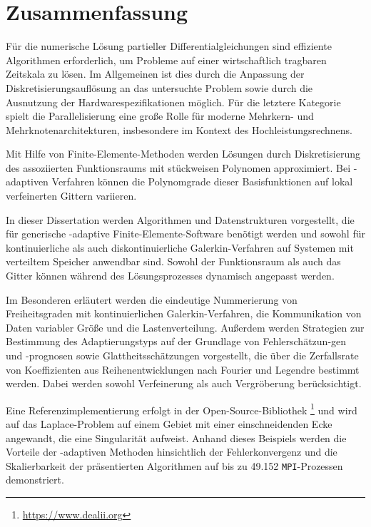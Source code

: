 \section*{\centering Zusammenfassung}

Für die numerische Lösung partieller Differentialgleichungen sind effiziente Algorithmen erforderlich, um Probleme auf einer wirtschaftlich tragbaren Zeitskala zu lösen.
Im Allgemeinen ist dies durch die Anpassung der Diskretisierungsauflösung an das untersuchte Problem sowie durch die Ausnutzung der Hardwarespezifikationen möglich.
Für die letztere Kategorie spielt die Parallelisierung eine große Rolle für moderne Mehrkern- und Mehrknotenarchitekturen, insbesondere im Kontext des Hochleistungsrechnens.

Mit Hilfe von Finite-Elemente-Methoden werden Lösungen durch Diskretisierung des assoziierten Funktionsraums mit stückweisen Polynomen approximiert. Bei \hp-adaptiven Verfahren können die Polynomgrade dieser Basisfunktionen auf lokal verfeinerten Gittern variieren.

In dieser Dissertation werden Algorithmen und Datenstrukturen vorgestellt, die für generische \hp-adaptive Finite-Elemente-Software benötigt werden und sowohl für kontinuierliche als auch diskontinuierliche Galerkin-Verfahren auf Systemen mit verteiltem Speicher anwendbar sind. Sowohl der Funktionsraum als auch das Gitter können während des Lösungsprozesses dynamisch angepasst werden.

Im Besonderen erläutert werden die eindeutige Nummerierung von Freiheitsgraden mit kontinuierlichen Galerkin-Verfahren, die Kommunikation von Daten variabler Größe und die Lastenverteilung.
Außerdem werden Strategien zur Bestimmung des Adaptierungstyps auf der Grundlage von Fehlerschätzun-gen und -prognosen sowie Glattheitsschätzungen vorgestellt, die über die Zerfallsrate von Koeffizienten aus Reihenentwicklungen nach Fourier und Legendre bestimmt werden. Dabei werden sowohl Verfeinerung als auch Vergröberung berücksichtigt.

Eine Referenzimplementierung erfolgt in der Open-Source-Bibliothek \linebreak \dealii{}\footnote{\url{https://www.dealii.org}} und wird auf das Laplace-Problem auf einem Gebiet mit einer einschneidenden Ecke angewandt, die eine Singularität aufweist. Anhand dieses Beispiels werden die Vorteile der \hp{}-adaptiven Methoden hinsichtlich der Fehlerkonvergenz und die Skalierbarkeit der präsentierten Algorithmen auf bis zu 49.152 \texttt{MPI}-Prozessen demonstriert.